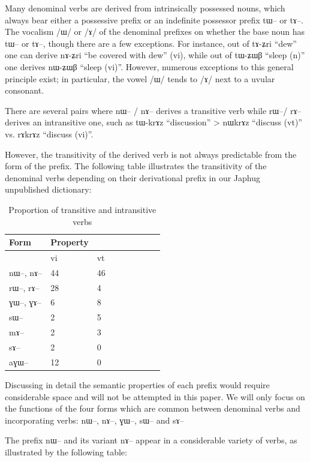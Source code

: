 \documentclass[oldfontcommands,oneside,a4paper,11pt]{article}
\newcommand{\ipa}[1]{{\phon #1}} %
\begin{document}
Many denominal verbs are derived from intrinsically possessed nouns, which always bear either a possessive prefix or an indefinite possessor prefix \ipa{tɯ}-- or \ipa{tɤ}--. The vocalism /ɯ/ or /ɤ/ of the denominal prefixes on whether the base noun has \ipa{tɯ}-- or \ipa{tɤ}--, though there are a few exceptions. For instance, out of \ipa{tɤ-ʑri} ``dew'' one can derive \ipa{nɤ-ʑri} ``be covered with dew'' (vi), while out of \ipa{tɯ-ʑɯβ} ``sleep (n)'' one derives \ipa{nɯ-ʑɯβ} ``sleep (vi)''. However, numerous exceptions to this general principle exist; in particular, the vowel /ɯ/ tends to /ɤ/ next to a uvular consonant.


There are several pairs where \ipa{nɯ}-- / \ipa{nɤ}-- derives a transitive verb while \ipa{rɯ}--/ \ipa{rɤ}-- derives an intransitive one, such as \ipa{tɯ-krɤz} ``discussion'' > \ipa{nɯkrɤz} ``discuss (vt)'' vs. \ipa{rɤkrɤz} ``discuss (vi)''.

However, the transitivity of the derived verb is not always predictable from the form of the prefix. The following table illustrates the transitivity of the denominal verbs depending on their derivational prefix in our Japhug unpublished dictionary:


\begin{table}[H] \centering
\caption{Proportion of transitive and intransitive verbs}\label{tab:denom.pref2} 
\begin{tabular}{lllllllll} \toprule
Form& Property \\
\midrule
		&	vi	&	vt	\\
\ipa{nɯ}--,	\ipa{nɤ}--	&	44	&	46	\\
\ipa{rɯ}--,	\ipa{rɤ}--	&	28	&	4	\\
\ipa{ɣɯ}--,	\ipa{ɣɤ}--	&	6	&	8	\\
\ipa{sɯ}--		&	2	&	5	\\
\ipa{mɤ}--		&	2	&	3	\\
\ipa{sɤ}--		&	2	&		0\\
\ipa{aɣɯ}--		&	12	&	0	\\
    \bottomrule
\end{tabular}
\end{table}
Discussing in detail the semantic properties of each prefix would require considerable space and will not be attempted in this paper. We will only focus on the functions of the four forms which are common between denominal verbs and incorporating verbs: \ipa{nɯ}--, \ipa{nɤ}--, \ipa{ɣɯ}--, \ipa{sɯ}-- and \ipa{sɤ}--

The prefix \ipa{nɯ}-- and its variant \ipa{nɤ}-- appear in a considerable variety of verbs, as illustrated by the following table:
\end{document}
